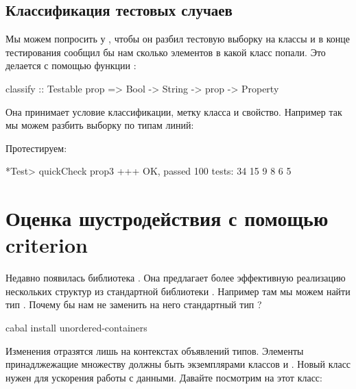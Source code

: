 \subsection{Классификация тестовых случаев}

Мы можем попросить у , чтобы
он разбил тестовую выборку на классы и в конце
тестирования сообщил бы нам сколько элементов в 
какой класс попали. Это делается с помощью функции
:

\begin{code}
classify :: Testable prop => Bool -> String -> prop -> Property
\end{code}

Она принимает условие классификации, метку класса и свойство.
Например так мы можем разбить выборку по типам линий:


Протестируем:

\begin{code}
*Test> quickCheck prop3
+++ OK, passed 100 tests:
34%
15%
 9%
 8%
 6%
 5%
\end{code}


\section{Оценка шустродействия с помощью criterion}

Недавно появилась библиотека . 
Она предлагает более эффективную реализацию нескольких
структур из стандартной библиотеки .
Например там мы можем найти тип . 
Почему бы нам не заменить на него стандартный тип ?

\begin{code}
cabal install unordered-containers
\end{code}

Изменения отразятся лишь на контекстах объявлений типов. 
Элементы принадлжежащие множеству 
должны быть экземплярами классов  и .
Новый класс  нужен для ускорения работы
с данными. Давайте посмотрим на этот класс:

